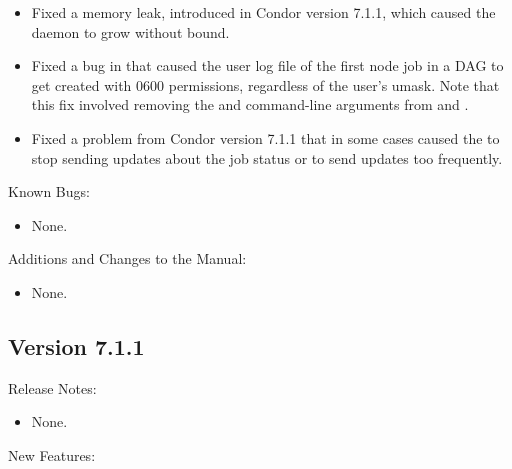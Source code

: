\begin{itemize}

\item Fixed a memory leak, introduced in Condor version 7.1.1, which caused the
   daemon to grow without bound.

\item Fixed a bug in  that caused the user log file of
the first node job in a DAG to get created with 0600 permissions,
regardless of the user's umask.  Note that this fix involved removing
the  and  command-line arguments from
 and .

\item Fixed a problem from Condor version 7.1.1 that in some cases caused the
 to stop sending updates about the job status or
to send updates too frequently.

\end{itemize}

\noindent Known Bugs:

\begin{itemize}

\item None.

\end{itemize}

\noindent Additions and Changes to the Manual:

\begin{itemize}

\item None.

\end{itemize}


\subsection*{\label{sec:New-7-1-1}Version 7.1.1}

\noindent Release Notes:

\begin{itemize}

\item None.

\end{itemize}


\noindent New Features:

